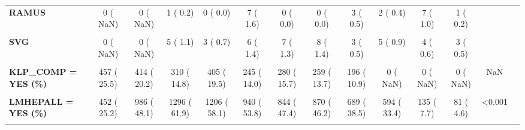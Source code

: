 \documentclass[
]{article}
\begin{document}
\begin{table}[H]
\begin{tabular}[t]{>{\raggedright\arraybackslash}p{5em}ccccccccccccc}
\textbf{RAMUS} & 0 (  NaN) & 0 (  NaN) & 1 (  0.2) & 0 (  0.0) & 7 (  1.6) & 0 (  0.0) & 0 (  0.0) & 3 (  0.5) & 2 (  0.4) & 7 (  1.0) & 1 (  0.2) &  & \\
\textbf{\cellcolor{gray!10}{RCA}} & \cellcolor{gray!10}{0 (  NaN)} & \cellcolor{gray!10}{0 (  NaN)} & \cellcolor{gray!10}{140 ( 30.0)} & \cellcolor{gray!10}{127 ( 29.0)} & \cellcolor{gray!10}{158 ( 36.0)} & \cellcolor{gray!10}{192 ( 37.0)} & \cellcolor{gray!10}{200 ( 34.4)} & \cellcolor{gray!10}{207 ( 35.8)} & \cellcolor{gray!10}{213 ( 38.4)} & \cellcolor{gray!10}{229 ( 32.1)} & \cellcolor{gray!10}{220 ( 35.3)} & \cellcolor{gray!10}{} & \cellcolor{gray!10}{}\\
\textbf{SVG} & 0 (  NaN) & 0 (  NaN) & 5 (  1.1) & 3 (  0.7) & 6 (  1.4) & 7 (  1.3) & 8 (  1.4) & 3 (  0.5) & 5 (  0.9) & 4 (  0.6) & 3 (  0.5) &  & \\
\textbf{\cellcolor{gray!10}{ISHDAYS (mean (SD))}} & \cellcolor{gray!10}{7.97 (5.78)} & \cellcolor{gray!10}{7.55 (9.33)} & \cellcolor{gray!10}{6.37 (5.06)} & \cellcolor{gray!10}{7.09 (6.24)} & \cellcolor{gray!10}{5.89 (5.67)} & \cellcolor{gray!10}{5.21 (4.22)} & \cellcolor{gray!10}{5.25 (4.83)} & \cellcolor{gray!10}{5.06 (5.46)} & \cellcolor{gray!10}{4.54 (4.18)} & \cellcolor{gray!10}{4.62 (5.87)} & \cellcolor{gray!10}{4.19 (4.82)} & \cellcolor{gray!10}{<0.001} & \cellcolor{gray!10}{}\\
\textbf{KLP\_COMP = YES (\%)} & 457 ( 25.5) & 414 ( 20.2) & 310 ( 14.8) & 405 ( 19.5) & 245 ( 14.0) & 280 ( 15.7) & 259 ( 13.7) & 196 ( 10.9) & 0 (  NaN) & 0 (  NaN) & 0 (  NaN) & NaN & \\
\textbf{\cellcolor{gray!10}{LLD\_CHR = YES (\%)}} & \cellcolor{gray!10}{0 (  0.0)} & \cellcolor{gray!10}{594 ( 29.0)} & \cellcolor{gray!10}{708 ( 33.8)} & \cellcolor{gray!10}{972 ( 46.8)} & \cellcolor{gray!10}{879 ( 50.3)} & \cellcolor{gray!10}{951 ( 53.5)} & \cellcolor{gray!10}{976 ( 51.8)} & \cellcolor{gray!10}{908 ( 50.7)} & \cellcolor{gray!10}{764 ( 43.0)} & \cellcolor{gray!10}{726 ( 41.5)} & \cellcolor{gray!10}{657 ( 37.4)} & \cellcolor{gray!10}{<0.001} & \cellcolor{gray!10}{}\\
\textbf{LMHEPALL = YES (\%)} & 452 ( 25.2) & 986 ( 48.1) & 1296 ( 61.9) & 1206 ( 58.1) & 940 ( 53.8) & 844 ( 47.4) & 870 ( 46.2) & 689 ( 38.5) & 594 ( 33.4) & 135 (  7.7) & 81 (  4.6) & <0.001 & \\
\textbf{\cellcolor{gray!10}{MACE = YES (\%)}} & \cellcolor{gray!10}{476 ( 26.5)} & \cellcolor{gray!10}{381 ( 18.6)} & \cellcolor{gray!10}{305 ( 14.6)} & \cellcolor{gray!10}{341 ( 16.4)} & \cellcolor{gray!10}{219 ( 12.5)} & \cellcolor{gray!10}{184 ( 10.3)} & \cellcolor{gray!10}{196 ( 10.4)} & \cellcolor{gray!10}{159 (  8.9)} & \cellcolor{gray!10}{143 (  8.4)} & \cellcolor{gray!10}{172 (  9.8)} & \cellcolor{gray!10}{87 (  7.4)} & \cellcolor{gray!10}{<0.001} & \cellcolor{gray!10}{}\\

\end{tabular}
\end{table}
\end{document}
